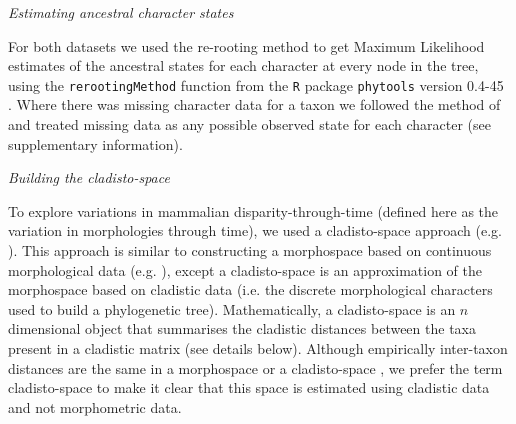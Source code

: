 \documentclass[12pt,letterpaper]{article}
\renewcommand{\subsection}[1]{%
\bigskip
\begin{center}
\begin{large}
\normalfont\itshape #1
\end{large}
\end{center}}
\begin{document}
\subsection{Estimating ancestral character states}
For both datasets we used the re-rooting method \cite{Yang01121995,Garland2000} to get Maximum Likelihood estimates of the ancestral states for each character at every node in the tree, using the \texttt{rerootingMethod} function from the \texttt{R} package \texttt{phytools} version 0.4-45 \cite{phytools,R}.
Where there was missing character data for a taxon we followed the method of \cite{Claddis} and treated missing data as any possible observed state for each character (see supplementary information).

\subsection{Building the cladisto-space}
To explore variations in mammalian disparity-through-time (defined here as the variation in morphologies through time), we used a cladisto-space approach (e.g. \cite{Brusatte12092008,friedmanexplosive2010,toljagictriassic-jurassic2013}).
This approach is similar to constructing a morphospace based on continuous morphological data (e.g. \cite{friedmanexplosive2010}), except a cladisto-space is an approximation of the morphospace based on cladistic data (i.e. the discrete morphological characters used to build a phylogenetic tree).
Mathematically, a cladisto-space is an $n$ dimensional object that summarises the cladistic distances between the taxa present in a cladistic matrix (see details below).
Although empirically inter-taxon distances are the same in a morphospace or a cladisto-space \cite{foth2012different,hetherington2015cladistic}, we prefer the term cladisto-space to make it clear that this space is estimated using cladistic data and not morphometric data.
\end{document}

